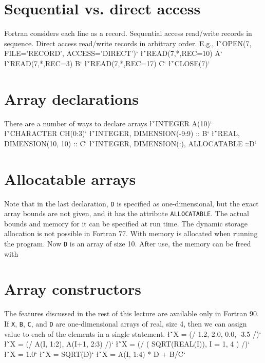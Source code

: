 {\section{Sequential vs. direct access}
Fortran considers each line as a record.  Sequential access read/write
records in sequence.  Direct access read/write records in arbitrary order.
E.g.,
\sms
\l{\v`OPEN(7, FILE='RECORD', ACCESS='DIRECT')`}
\l{\v`READ(7,*,REC=10) A`}
\l{\v`READ(7,*,REC=3) B`}
\l{\v`READ(7,*,REC=17) C`}
\l{\v`CLOSE(7)`}
\sms


\section{Array declarations}
There are a number of ways to declare arrays 
\sms
\l{\v`INTEGER A(10)`}
\l{\v`CHARACTER CH(0:3)`}
\l{\v`INTEGER, DIMENSION(-9:9) :: B`}
\l{\v`REAL, DIMENSION(10, 10) :: C`}
\l{\v`INTEGER, DIMENSION(:), ALLOCATABLE ::D`}
\sms

\section{Allocatable arrays} 

Note that in the last declaration, {\tt D} is specified as
one-\-dimensional, but the exact array bounds are not given, and it has
the attribute {\tt ALLOCATABLE}.   The actual bounds and memory for it can
be specified at run time.
The dynamic storage allocation  is not possible in Fortran 77.
With
\sms
{}
\sms
memory is allocated when running the program.
Now {\tt D} is an array of size 10.  After use, the memory can be freed with
\sms
{}
\sms

\section{Array constructors}
The features discussed in the rest of this lecture are available only in 
Fortran 90. If {\tt X}, {\tt B}, {\tt C}, and {\tt D} are one-dimensional 
arrays of real, size 4, then we can assign value to each of the elements 
in a single statement.
\sms
\l{\v`X = (/ 1.2, 2.0, 0.0, -3.5 /)`}
\l{\v`X = (/ A(I, 1:2), A(I+1, 2:3) /)`}
\l{\v`X = (/ ( SQRT(REAL(I)), I = 1, 4 ) /)`}
\l{\v`X = 1.0`}
\l{\v`X = SQRT(D)`}
\l{\v`X = A(I, 1:4) * D + B/C`}
\sms

}
